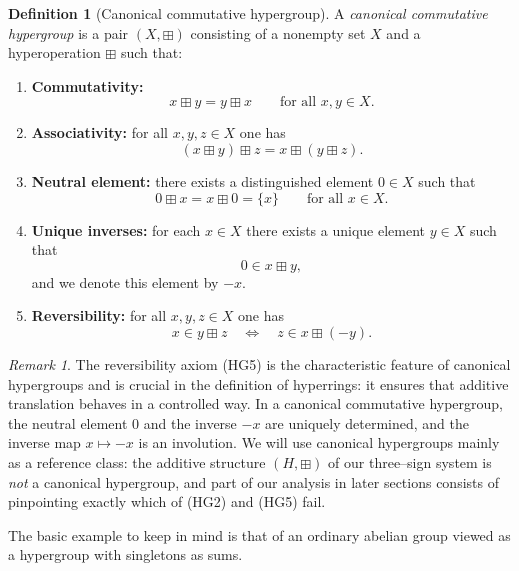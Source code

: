 \documentclass[11pt]{amsart}
\numberwithin{equation}{section}
\theoremstyle{definition}
\newtheorem{definition}[theorem]{Definition}
\theoremstyle{remark}
\newtheorem{remark}[theorem]{Remark}
\newcommand{\Hnum}{H}                      %
\newcommand{\op}{\boxplus}                 %
\begin{document}
\begin{definition}[Canonical commutative hypergroup]\label{def:canonical-hypergroup}
A \emph{canonical commutative hypergroup} is a pair $(X,\boxplus)$
consisting of a nonempty set $X$ and a hyperoperation $\boxplus$ such
that:
\begin{enumerate}
  \item[\textnormal{(HG1)}] \textbf{Commutativity:}
  \[
    x\boxplus y = y\boxplus x
    \qquad\text{for all }x,y\in X.
  \]

  \item[\textnormal{(HG2)}] \textbf{Associativity:} for all
        $x,y,z\in X$ one has
  \[
    (x\boxplus y)\boxplus z
    = x\boxplus(y\boxplus z).
  \]

  \item[\textnormal{(HG3)}] \textbf{Neutral element:} there exists a
        distinguished element $0\in X$ such that
  \[
    0\boxplus x = x\boxplus 0 = \{x\}
    \qquad\text{for all }x\in X.
  \]

  \item[\textnormal{(HG4)}] \textbf{Unique inverses:} for each
        $x\in X$ there exists a unique element $y\in X$ such that
  \[
    0 \in x\boxplus y,
  \]
  and we denote this element by $-x$.

  \item[\textnormal{(HG5)}] \textbf{Reversibility:} for all
        $x,y,z\in X$ one has
  \[
    x\in y\boxplus z
    \quad\Longleftrightarrow\quad
    z \in x\boxplus(-y).
  \]
\end{enumerate}
\end{definition}

\begin{remark}\label{rem:canonical-hypergroup}
The reversibility axiom (HG5) is the characteristic feature of
canonical hypergroups and is crucial in the definition of hyperrings:
it ensures that additive translation behaves in a controlled way.  In a
canonical commutative hypergroup, the neutral element $0$ and the
inverse $-x$ are uniquely determined, and the inverse map $x\mapsto-x$
is an involution.  We will use canonical hypergroups mainly as a
reference class: the additive structure $(\Hnum,\op)$ of our
three--sign system is \emph{not} a canonical hypergroup, and part of
our analysis in later sections consists of pinpointing exactly which
of (HG2) and (HG5) fail.
\end{remark}

The basic example to keep in mind is that of an ordinary abelian group
viewed as a hypergroup with singletons as sums.
\end{document}
